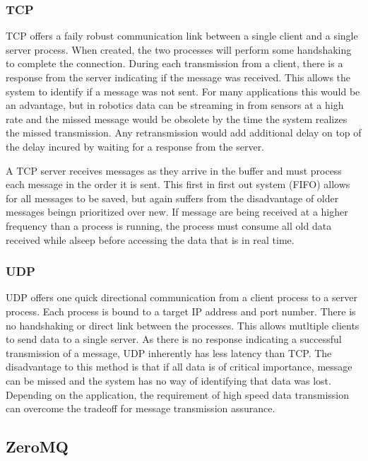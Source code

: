 \subsubsection{TCP}

TCP offers a faily robust communication link between a single client and a single server process. When created, the two processes will perform some handshaking to complete the connection. During each transmission from a client, there is a response from the server indicating if the message was received. This allows the system to identify if a message was not sent. For many applications this would be an advantage, but in robotics data can be streaming in from sensors at a high rate and the missed message would be obsolete by the time the system realizes the missed transmission\cite{UDPTCP}. Any retransmission would add additional delay on top of the delay incured by waiting for a response from the server.

A TCP server receives messages as they arrive in the buffer and must process each message in the order it is sent. This first in first out system (FIFO) allows for all messages to be saved, but again suffers from the disadvantage of older messages beingn prioritized over new. If message are being received at a higher frequency than a process is running, the process must consume all old data received while alseep before accessing the data that is in real time.

\subsubsection{UDP}

UDP offers one quick directional communication from a client process to a server process. Each process is bound to a target IP address and port number. There is no handshaking or direct link between the processes. This allows mutltiple clients to send data to a single server. As there is no response indicating a successful transmission of a message, UDP inherently has less latency than TCP. The disadvantage to this method is that if all data is of critical importance, message can be missed and the system has no way of identifying that data was lost. Depending on the application, the requirement of high speed data transmission can overcome the tradeoff for message transmission assurance.

\subsection{ZeroMQ}

